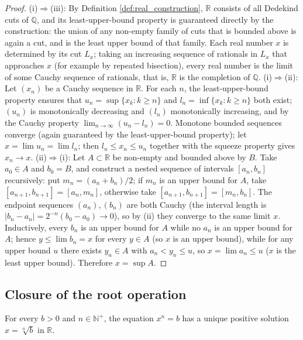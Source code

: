 \begin{proof}
(i)$\Rightarrow$(iii): By Definition \ref{def:real_construction}, $\mathbb{R}$ consists of all Dedekind cuts of $\mathbb{Q}$, and its least-upper-bound property is guaranteed directly by the construction: the union of any non-empty family of cuts that is bounded above is again a cut, and is the least upper bound of that family. Each real number $x$ is determined by its cut $L_x$; taking an increasing sequence of rationals in $L_x$ that approaches $x$ (for example by repeated bisection), every real number is the limit of some Cauchy sequence of rationals, that is, $\mathbb{R}$ is the completion of $\mathbb{Q}$.
(i)$\Rightarrow$(ii): Let $(x_n)$ be a Cauchy sequence in $\mathbb{R}$. For each $n$, the least-upper-bound property ensures that $u_n = \sup\{x_k : k \ge n\}$ and $l_n = \inf\{x_k : k \ge n\}$ both exist; $(u_n)$ is monotonically decreasing and $(l_n)$ monotonically increasing, and by the Cauchy property $\lim_{n\to\infty}(u_n - l_n) = 0$. Monotone bounded sequences converge (again guaranteed by the least-upper-bound property); let $x = \lim u_n = \lim l_n$; then $l_n \le x_n \le u_n$ together with the squeeze property gives $x_n \to x$.
(ii)$\Rightarrow$(i): Let $A \subset \mathbb{R}$ be non-empty and bounded above by $B$. Take $a_0 \in A$ and $b_0 = B$, and construct a nested sequence of intervals $[a_n, b_n]$ recursively: put $m_n = (a_n+b_n)/2$; if $m_n$ is an upper bound for $A$, take $[a_{n+1}, b_{n+1}] = [a_n, m_n]$, otherwise take $[a_{n+1}, b_{n+1}] = [m_n, b_n]$. The endpoint sequences $(a_n),(b_n)$ are both Cauchy (the interval length is $|b_n - a_n| = 2^{-n}(b_0 - a_0) \to 0$), so by (ii) they converge to the same limit $x$. Inductively, every $b_n$ is an upper bound for $A$ while no $a_n$ is an upper bound for $A$; hence $y \le \lim b_n = x$ for every $y \in A$ (so $x$ is an upper bound), while for any upper bound $u$ there exists $y_n \in A$ with $a_n < y_n \le u$, so $x = \lim a_n \le u$ ($x$ is the least upper bound). Therefore $x = \sup A$.
\end{proof}

\subsection{\texorpdfstring{Closure of the root operation}{Closure of the root operation}}

\begin{theorem}\label{thm:real_root_closure}
For every $b > 0$ and $n \in \mathbb{N}^+$, the equation $x^n = b$ has a unique positive solution $x = \sqrt[n]{b}$ in $\mathbb{R}$.
\end{theorem}

